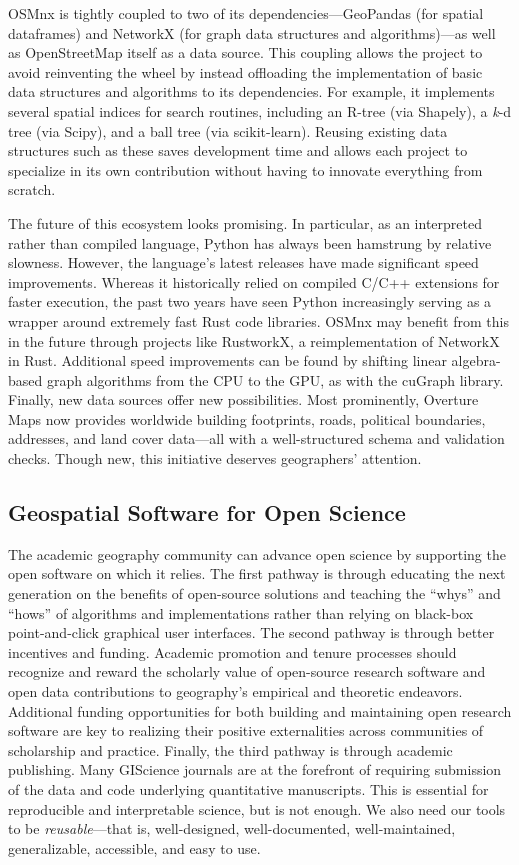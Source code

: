 \documentclass[12pt,letterpaper]{article} %
\begin{document}
OSMnx is tightly coupled to two of its dependencies---GeoPandas (for spatial dataframes) and NetworkX (for graph data structures and algorithms)---as well as OpenStreetMap itself as a data source. This coupling allows the project to avoid reinventing the wheel by instead offloading the implementation of basic data structures and algorithms to its dependencies. For example, it implements several spatial indices for search routines, including an R-tree (via Shapely), a \textit{k}-d tree (via Scipy), and a ball tree (via scikit-learn). Reusing existing data structures such as these saves development time and allows each project to specialize in its own contribution without having to innovate everything from scratch.

The future of this ecosystem looks promising. In particular, as an interpreted rather than compiled language, Python has always been hamstrung by relative slowness. However, the language's latest releases have made significant speed improvements. Whereas it historically relied on compiled C/C++ extensions for faster execution, the past two years have seen Python increasingly serving as a wrapper around extremely fast Rust code libraries. OSMnx may benefit from this in the future through projects like RustworkX, a reimplementation of NetworkX in Rust. Additional speed improvements can be found by shifting linear algebra-based graph algorithms from the CPU to the GPU, as with the cuGraph library. Finally, new data sources offer new possibilities. Most prominently, Overture Maps now provides worldwide building footprints, roads, political boundaries, addresses, and land cover data---all with a well-structured schema and validation checks. Though new, this initiative deserves geographers' attention.

\subsection{Geospatial Software for Open Science}

The academic geography community can advance open science by supporting the open software on which it relies. The first pathway is through educating the next generation on the benefits of open-source solutions and teaching the \enquote{whys} and \enquote{hows} of algorithms and implementations rather than relying on black-box point-and-click graphical user interfaces. The second pathway is through better incentives and funding. Academic promotion and tenure processes should recognize and reward the scholarly value of open-source research software and open data contributions to geography's empirical and theoretic endeavors. Additional funding opportunities for both building and maintaining open research software are key to realizing their positive externalities across communities of scholarship and practice. Finally, the third pathway is through academic publishing. Many GIScience journals are at the forefront of requiring submission of the data and code underlying quantitative manuscripts. This is essential for reproducible and interpretable science, but is not enough. We also need our tools to be \textit{reusable}---that is, well-designed, well-documented, well-maintained, generalizable, accessible, and easy to use.
\end{document}
